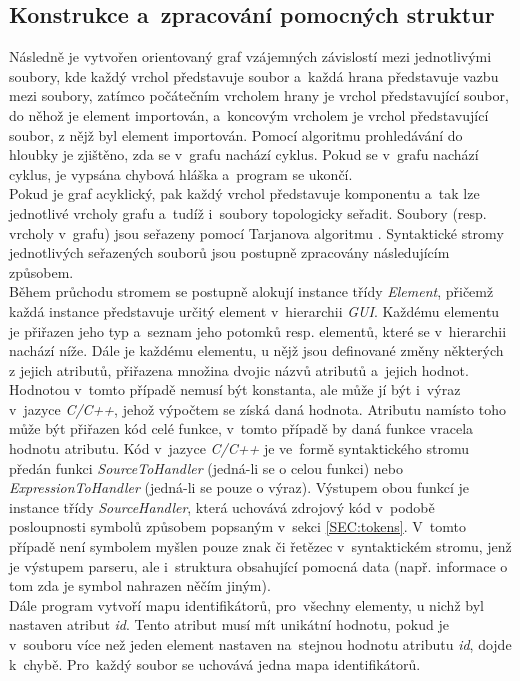 \documentclass[11pt,twoside,a4paper]{book}
\begin{document}
\subsection{Konstrukce a~zpracování pomocných struktur}
Následně je vytvořen orientovaný graf vzájemných závislostí mezi jednotlivými soubory, kde každý vrchol představuje soubor a~každá hrana představuje vazbu mezi soubory, zatímco počátečním vrcholem hrany je vrchol představující soubor, do něhož je element importován, a~koncovým vrcholem je vrchol představující soubor, z nějž byl element importován. Pomocí algoritmu prohledávání do hloubky je zjištěno, zda se v~grafu nachází cyklus. Pokud se v~grafu nachází cyklus, je vypsána chybová hláška a~program se ukončí.\\
Pokud je graf acyklický, pak každý vrchol představuje komponentu a~tak lze jednotlivé vrcholy grafu a~tudíž i~soubory topologicky seřadit. Soubory (resp. vrcholy v~grafu) jsou seřazeny pomocí Tarjanova algoritmu \cite{bib:tarj}. Syntaktické stromy jednotlivých seřazených souborů jsou postupně zpracovány následujícím způsobem.\\
Během průchodu stromem se postupně alokují instance třídy \textit{Element}, přičemž každá instance představuje určitý element v~hierarchii \textit{GUI}. Každému elementu je přiřazen jeho typ a~seznam jeho potomků resp. elementů, které se v~hierarchii nachází níže. Dále je každému elementu, u nějž jsou definované změny některých z jejich atributů, přiřazena množina dvojic názvů atributů a~jejich hodnot. Hodnotou v~tomto případě nemusí být konstanta, ale může jí být i~výraz v~jazyce \textit{C/C++}, jehož výpočtem se získá daná hodnota. Atributu namísto toho může být přiřazen kód celé funkce, v~tomto případě by daná funkce vracela hodnotu atributu. Kód v~jazyce \textit{C/C++} je ve~formě syntaktického stromu předán funkci \textit{SourceToHandler} (jedná-li se o celou funkci) nebo \textit{ExpressionToHandler} (jedná-li se pouze o výraz). Výstupem obou funkcí je instance třídy \textit{SourceHandler}, která uchovává zdrojový kód v~podobě posloupnosti symbolů způsobem popsaným v~sekci \ref{SEC:tokens}. V~tomto případě není symbolem myšlen pouze znak či řetězec v~syntaktickém stromu, jenž je výstupem parseru, ale i~struktura obsahující pomocná data (např. informace o tom zda je symbol nahrazen něčím jiným).\\
Dále program vytvoří mapu identifikátorů, pro~všechny elementy, u nichž byl nastaven atribut \textit{id}. Tento atribut musí mít unikátní hodnotu, pokud je v~souboru více než jeden element nastaven na~stejnou hodnotu atributu \textit{id}, dojde k~chybě. Pro~každý soubor se uchovává jedna mapa identifikátorů.\\
\end{document}
